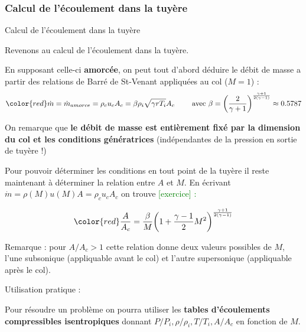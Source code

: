 \subsubsection{Calcul de l'écoulement dans la tuyère}


\begin{frame}{Calcul de l'écoulement dans la tuyère}

\small





Revenons au calcul de l'écoulement dans la tuyère. 
\medskip 
\pause 

En supposant celle-ci {\bf amorcée},  on peut tout d'abord déduire le débit de masse
a partir des relations de Barré de St-Venant appliquées au col ($M=1$) :
\medskip
\pause 
$$
\color{red}
\dot m = {\dot m}_{amorce} = \rho_c u_c A_c = \beta \rho_i \sqrt{\gamma r T_i} A_c  \qquad \mbox{ avec } 
\beta = {\left(\frac{2}{\gamma+1}\right)}^{\frac{\gamma+1}{2(\gamma-1)}} \approx 0.5787
$$

\pause

On remarque que {\bf le débit de masse est entièrement fixé par la dimension du col et les conditions génératrices}
(indépendantes de la pression en sortie de tuyère  !)


\medskip

Pour pouvoir déterminer les conditions en tout point de la tuyère il reste maintenant à déterminer la relation entre $A$ et $M$.  
En écrivant $\dot m = \rho(M) u(M) A =  \rho_c u_c A_c$  on trouve \textcolor{green}{[exercice] :}

$$
\color{red}
\frac{A}{A_c} = \frac{\beta}{M}  {\left(1 + \frac{\gamma-1}{2}M^2 \right)}^{\frac{\gamma+1}{2(\gamma-1)}}
$$

Remarque : pour $A/A_c>1$ cette relation donne deux valeurs possibles de $M$, l'une subsonique (appliquable avant le col) et l'autre 
supersonique (appliquable après le col).


\medskip

\pause
Utilisation pratique :

Pour résoudre un problème on pourra utiliser les {\bf tables d'écoulements compressibles isentropiques} donnant 
$P/P_i, \rho/\rho_i, T/T_i, A/A_c$ en fonction de $M$.



\vspace{0mm}

\end{frame}


